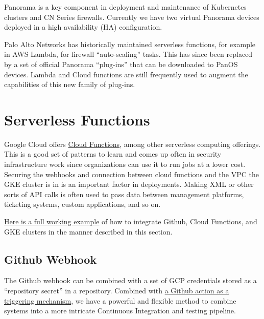 \vspace{2mm}

\justifying
Panorama is a key component in deployment and maintenance of Kubernetes clusters and CN Series firewalls. Currently we have
two virtual Panorama devices deployed in a high availability (HA) configuration.

\justifying
Palo Alto Networks has historically maintained serverless functions, for example in AWS Lambda, for firewall ``auto-scaling'' tasks. This has since been
replaced by a set of official Panorama ``plug-ins'' that can be downloaded to PanOS devices. Lambda and Cloud functions
are still frequently used to augment the capabilities of this new family of plug-ins.
\vspace{2mm}


\section{\label{sec:SRV}Serverless Functions}
\vspace{2mm}

\justifying
Google Cloud offers \href{https://cloud.google.com/functions/docs/concepts/overview}{Cloud Functions}, among other serverless computing offerings.
This is a good set of patterns to learn and comes up often
in security infrastructure work since organizations can use it to run jobs at a lower cost. Securing the
webhooks and connection between cloud functions and the VPC the GKE cluster is in is an important
factor in deployments. Making XML or other sorts of API calls is often used to pass data between management platforms, ticketing systems,
custom applications, and so on.
\vspace{2mm}

\justifying
\href{https://github.com/devsecfranklin/workshop-codemash-2023}{Here is a full working example} of how to integrate Github, Cloud Functions,
and GKE clusters in the manner described in this section.

\subsection{Github Webhook}
\vspace{2mm}

\justifying
The Github webhook can be combined with a set of GCP credentials stored as a ``repository secret'' in
a repository. Combined with \href{https://github.com/devsecfranklin/workshop-codemash-2023/blob/main/.github/workflows/cloudbot-call.yml}{a Github action as a triggering mechanism},
we have a powerful and flexible
method to combine systems into a more intricate Continuous Integration and testing pipeline.

